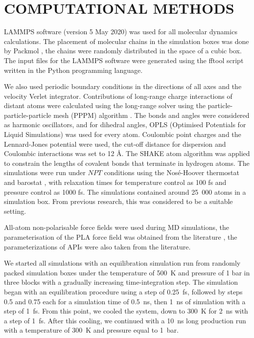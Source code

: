 \newpage
\section{COMPUTATIONAL METHODS}


LAMMPS software \cite{thompson_lammps_2022} (version 5 May 2020) was used for all molecular dynamics calculations. The placement of molecular chains in the simulation boxes was done by Packmol \cite{martinez_p_2009}, the chains were randomly distributed in the space of a cubic box. The input files for the LAMMPS software were generated using the fftool \cite{fftool} script written in the Python programming language.

We also used periodic boundary conditions in the directions of all axes and the velocity Verlet integrator. Contributions of long-range charge interactions of distant atoms were calculated using the long-range solver using the particle-particle-particle mesh (PPPM) algorithm \cite{hockney_computer_2021}. The bonds and angles were considered as harmonic oscillators, and for dihedral angles, OPLS (Optimised Potentials for Liquid Simulations) was used for every atom.  Coulombic point charges and the Lennard-Jones potential were used, the cut-off distance for dispersion and Coulombic interactions was set to 12 \r{A}. The SHAKE atom algorithm \cite{ryckaert_numerical_1977} was applied to constrain the lengths of covalent bonds that terminate in hydrogen atoms. The simulations were run under $NPT$ conditions using the Nosé-Hoover thermostat and barostat \cite{tuckerman_liouville-operator_2006}, with relaxation times for temperature control as 100 fs and pressure control as 1000 fs. The simulations contained around 25~000 atoms in a simulation box. From previous research, this was considered to be a suitable setting. \cite{klajmon_glass_2023}

All-atom non-polarisable force fields were used during MD simulations, the parameterisation of the PLA force field was obtained from the literature \cite{mcaliley_development_2011}, the parameterizations of APIs were also taken from the literature. \cite{cervinka_structure_2021}

We started all simulations with an equilibration simulation run from randomly packed simulation boxes under the temperature of 500~K and pressure of 1 bar in three blocks with a gradually increasing time-integration step. The simulation began with an equilibration procedure using a step of 0.25~fs, followed by steps 0.5 and 0.75 each for a simulation time of 0.5~ns, then 1~ns of simulation with a step of 1~fs. From this point, we cooled the system, down to 300~K for 2~ns with a step of 1~fs. After this cooling, we continued with a 10~ns long production run with a temperature of 300~K and pressure equal to 1~bar.

